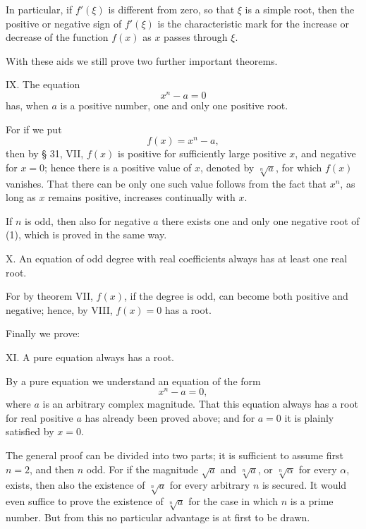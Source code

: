 \documentclass[11pt]{article}
\begin{document}
In particular, if $f'(\xi)$ is different from zero, so that $\xi$ is a simple root, then the positive or negative sign of $f'(\xi)$ is the characteristic mark for the increase or decrease of the function $f(x)$ as $x$ passes through $\xi$.

With these aids we still prove two further important theorems.

\medskip
\noindent IX. The equation
\[
 x^n-a=0
\]
has, when $a$ is a positive number, one and only one positive root.
\medskip

For if we put
\begin{equation}
 f(x)=x^n-a,
\tag{1}
\end{equation}
then by § 31, VII, $f(x)$ is positive for sufficiently large positive $x$, and negative for $x=0$; hence there is a positive value of $x$, denoted by $\sqrt[n]{a}$, for which $f(x)$ vanishes. That there can be only one such value follows from the fact that $x^n$, as long as $x$ remains positive, increases continually with $x$.

If $n$ is odd, then also for negative $a$ there exists one and only one negative root of (1), which is proved in the same way.

\medskip
\noindent X. An equation of odd degree with real coefficients always has at least one real root.
\medskip

For by theorem VII, $f(x)$, if the degree is odd, can become both positive and negative; hence, by VIII, $f(x)=0$ has a root.

Finally we prove:

\medskip
\noindent XI. A pure equation always has a root.
\medskip

By a pure equation we understand an equation of the form
\begin{equation}
 x^n-a=0,
\tag{2}
\end{equation}
where $a$ is an arbitrary complex magnitude. That this equation always has a root for real positive $a$ has already been proved above; and for $a=0$ it is plainly satisfied by $x=0$.

The general proof can be divided into two parts; it is sufficient to assume first $n=2$, and then $n$ odd. For if the magnitude $\sqrt{a}$ and $\sqrt[n]{a}$, or $\sqrt[n]{\alpha}$ for every $\alpha$, exists, then also the existence of $\sqrt[n]{a}$ for every arbitrary $n$ is secured. It would even suffice to prove the existence of $\sqrt[n]{a}$ for the case in which $n$ is a prime number. But from this no particular advantage is at first to be drawn.
\end{document}
